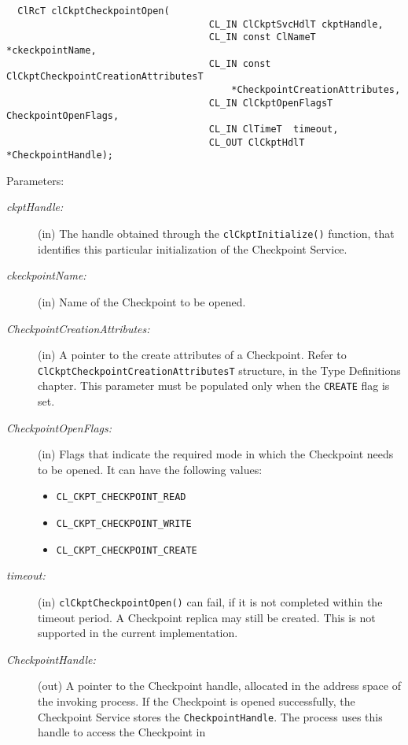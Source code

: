 \begin{flushleft}
\begin{Desc}
\footnotesize\begin{verbatim}  ClRcT clCkptCheckpointOpen(
                              		CL_IN ClCkptSvcHdlT ckptHandle,
                              		CL_IN const ClNameT *ckeckpointName,
                              		CL_IN const ClCkptCheckpointCreationAttributesT 
                              			*CheckpointCreationAttributes,
                              		CL_IN ClCkptOpenFlagsT CheckpointOpenFlags,
                              		CL_IN ClTimeT  timeout,
                              		CL_OUT ClCkptHdlT *CheckpointHandle);
\end{verbatim}
\normalsize
\end{Desc}
\begin{Desc}
\item[Parameters:]
\begin{description}
\item[{\em ckpt\-Handle:}](in) The handle obtained through the {\tt{clCkptInitialize()}} function, that identifies this particular initialization of 
the Checkpoint Service.
\item[{\em ckeckpoint\-Name:}](in) Name of the Checkpoint to be opened.
\item[{\em Checkpoint\-Creation\-Attributes:}](in) A pointer to the 
create attributes of a Checkpoint. Refer to {\tt{ClCkptCheckpointCreationAttributesT}} structure, in the Type Definitions chapter. This parameter must 
be populated only when the {\tt{CREATE}} flag is set.
\item[{\em Checkpoint\-Open\-Flags:}](in) Flags that indicate the required mode in which the Checkpoint needs to be opened. It can have the following
values: \begin{itemize}
\item {\tt{CL\_\-CKPT\_\-CHECKPOINT\_\-READ}} \item {\tt{CL\_\-CKPT\_\-CHECKPOINT\_\-WRITE}} \item {\tt{CL\_\-CKPT\_\-CHECKPOINT\_\-CREATE}} \end{itemize}
\item[{\em timeout:}](in) {\tt{cl\-Ckpt\-Checkpoint\-Open()}} can fail, if it is not completed within the timeout period. A Checkpoint replica may still be 
created. This is not supported in the current implementation.
\item[{\em Checkpoint\-Handle:}](out) A pointer to the Checkpoint handle, allocated in the address space of the invoking process. If the Checkpoint 
is opened successfully, the Checkpoint Service stores the {\tt{Checkpoint\-Handle}}. The process uses this handle to access the Checkpoint in 

\end{description}
\end{Desc}
\end{flushleft}
